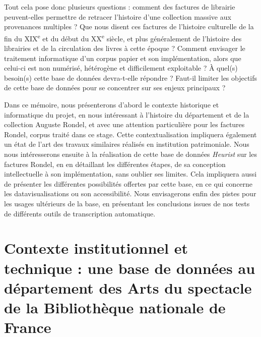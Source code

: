 \documentclass[12pt,twoside]{book}
\begin{document}
\vspace{1.5cm}
Tout cela pose donc plusieurs questions : comment des factures de librairie peuvent-elles permettre de retracer l'histoire d'une collection massive aux provenances multiples ? Que nous disent ces factures de l'histoire culturelle de la fin du XIX\textsuperscript{e} et du début du XX\textsuperscript{e}  siècle, et plus généralement de l'histoire des librairies et de la circulation des livres à cette époque ? Comment envisager le traitement informatique d'un corpus papier et son implémentation, alors que celui-ci est non numérisé, hétérogène et difficilement exploitable ? À quel(s) besoin(s) cette base de données devra-t-elle répondre ? Faut-il limiter les objectifs de cette base de données pour se concentrer sur ses enjeux principaux ?


\vspace{1.5cm}
Dans ce mémoire, nous présenterons d'abord le contexte historique et informatique du projet, en nous intéressant à l'histoire du département et de la collection Auguste Rondel, et avec une attention particulière pour les factures Rondel, corpus traité dans ce stage. Cette contextualisation impliquera également un état de l'art des travaux similaires réalisés en institution patrimoniale. Nous nous intéresserons ensuite à la réalisation de cette base de données \emph{Heurist} sur les factures Rondel, en en détaillant les différentes étapes, de sa conception intellectuelle à son implémentation, sans oublier ses limites. Cela impliquera aussi de présenter les différentes possibilités offertes par cette base, en ce qui concerne les datavisualisations ou son accessibilité. Nous envisagerons enfin des pistes pour les usages ultérieurs de la base, en présentant les conclusions issues de nos tests de différents outils de transcription automatique. 


\newpage{\pagestyle{empty}\cleardoublepage}

	\mainmatter

	

	\part{Contexte institutionnel et technique : une base de données au département des Arts du spectacle de la Bibliothèque nationale de France} 
%
%	
\end{document}
